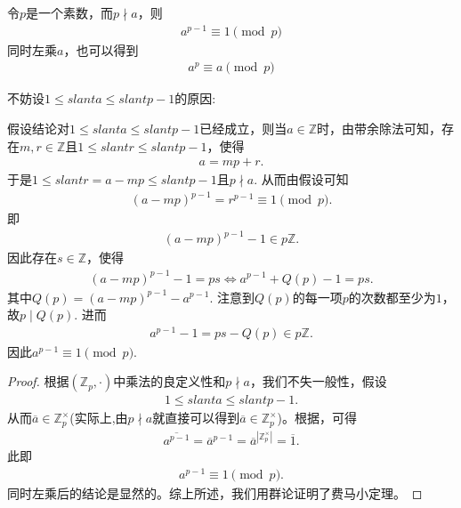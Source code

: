 \documentclass[../../main.tex]{subfiles}
\begin{document}
\begin{theorem}[Fermat小定理]\label{theorem:Fermat小定理}
令$p$是一个素数，而$p \nmid a$，则
\begin{align*}
a^{p - 1} \equiv 1 \pmod{p}
\end{align*}
同时左乘$a$，也可以得到
\begin{align*}
a^{p} \equiv a \pmod{p}
\end{align*}
\end{theorem}
\begin{note}
不妨设$1 \leqslant slant a \leqslant slant p - 1$的原因:

假设结论对$1 \leqslant slant a \leqslant slant p - 1$已经成立，则当$a \in \mathbb{Z}$时，由带余除法可知，存在$m, r \in \mathbb{Z}$且$1 \leqslant slant r \leqslant slant p - 1$，使得
\begin{align*}
a = mp + r.
\end{align*}
于是$1 \leqslant slant r = a - mp \leqslant slant p - 1$且$p \nmid a$. 从而由假设可知
\begin{align*}
(a - mp)^{p - 1} = r^{p - 1} \equiv 1 \pmod{p}.
\end{align*}
即
\begin{align*}
(a - mp)^{p - 1} - 1 \in p\mathbb{Z}.
\end{align*}
因此存在$s \in \mathbb{Z}$，使得
\begin{align*}
(a - mp)^{p - 1} - 1 = ps \iff a^{p - 1} + Q(p) - 1 = ps.
\end{align*}
其中$Q(p) = (a - mp)^{p - 1} - a^{p - 1}$. 注意到$Q(p)$的每一项$p$的次数都至少为$1$，故$p \mid Q(p)$. 进而
\begin{align*}
a^{p - 1} - 1 = ps - Q(p) \in p\mathbb{Z}.
\end{align*}
因此$a^{p - 1} \equiv 1 \pmod{p}$. 
\end{note}
\begin{proof}
根据$(\mathbb{Z}_p, \cdot)$中乘法的良定义性和$p \nmid a$，我们不失一般性，假设
\begin{align*}
1 \leqslant slant a \leqslant slant p - 1.
\end{align*}
从而$\overline{a} \in \mathbb{Z}_p^\times$(实际上,由$p \nmid a$就直接可以得到$\overline{a} \in \mathbb{Z}_p^\times$)。根据，可得
\begin{align*}
\overline{a^{p-1}}=\overline{a}^{p-1}=\overline{a}^{|\mathbb{Z}_p^\times|} = \overline{1}.
\end{align*}
此即
\begin{align*}
a^{p - 1} \equiv 1 \pmod{p}.
\end{align*}
同时左乘后的结论是显然的。综上所述，我们用群论证明了费马小定理。 
\end{proof}
\end{document}
